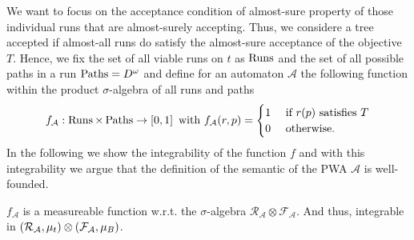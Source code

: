 We want to focus on the acceptance condition of almost-sure property of those
individual runs that are almost-surely accepting. Thus, we considere a tree
accepted if almost-all runs do satisfy the almost-sure acceptance of the
objective $T$. Hence, we fix the set of all viable runs on $t$ as $\operatorname{Runs}$ and
the set of all possible paths in a run $\operatorname{Paths} = D^{\omega}$ and define for an
automaton $\mathcal{A}$ the following function within the product
$\sigma$-algebra of all runs and paths
\begin{equation*}
  f_{\mathcal{A}}:\operatorname{Runs}\times\operatorname{Paths}\rightarrow\left[0,1\right]
  \text{ with }
  f_{\mathcal{A}}(r, p) = \begin{cases}
    1&\text{ if }r(p)\text{ satisfies }T\\
    0&\text{ otherwise.}
  \end{cases}
\end{equation*}
In the following we show the integrability of the function $f$ and with this
integrability we argue that the definition of the semantic of the \ac{PWA}
$\mathcal{A}$ is well-founded.
\begin{proposition}
  $f_{\mathcal{A}}$ is a measureable function w.r.t. the $\sigma$-algebra
  $\mathcal{R}_{\mathcal{A}}\otimes\mathcal{F}_{\mathcal{A}}$. And thus,
  integrable in $\left(\mathcal{R}_{\mathcal{A}},\mu_{t}\right)\otimes
  \left(\mathcal{F}_{\mathcal{A}},\mu_{B}\right)$.
\end{proposition}

